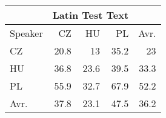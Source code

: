 \begin{tabular}{l|rrr|r}
\hline
 & \multicolumn{3}{c}{Latin Test Text} & \\
\hline
 Speaker   &   CZ &   HU &   PL &   Avr. \\
\hline
 CZ        & 20.8 & 13   & 35.2 &   23   \\
 HU        & 36.8 & 23.6 & 39.5 &   33.3 \\
 PL        & 55.9 & 32.7 & 67.9 &   52.2 \\
\hline
 Avr.     & 37.8 & 23.1 & 47.5 &   36.2 \\
\hline
\end{tabular}
